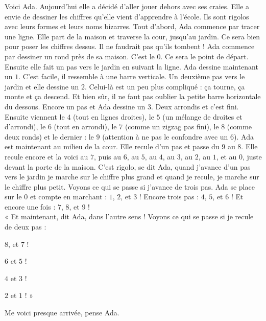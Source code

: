 Voici Ada. Aujourd'hui elle a décidé d'aller jouer dehors avec ses craies. 
Elle a envie de dessiner les chiffres qu'elle vient d'apprendre à l'école. Ils sont rigolos avec leurs formes et leurs noms bizarres.
Tout d'abord, Ada commence par tracer une ligne. Elle part de la maison et traverse la cour, jusqu'au jardin. 
Ce sera bien pour poser les chiffres dessus. Il ne faudrait pas qu'ils tombent ! 
Ada commence par dessiner un rond près de sa maison. C'est le $0$. Ce sera le point de départ. 
Ensuite elle fait un pas vers le jardin en suivant la ligne. Ada dessine maintenant un $1$. C'est facile, il ressemble à une barre verticale. 
Un deuxième pas vers le jardin et elle dessine un $2$. Celui-là est un peu plus compliqué : ça tourne, ça monte et ça descend. Et bien sûr, il ne faut pas oublier la petite barre horizontale du dessous.
Encore un pas et Ada dessine un $3$. Deux arrondis et c'est fini.
Ensuite viennent le $4$ (tout en lignes droites), le $5$ (un mélange de droites et d'arrondi), le $6$ (tout en arrondi), le $7$ (comme un zigzag pas fini), le $8$ (comme deux ronds) et le dernier : le $9$ (attention à ne pas le confondre avec un $6$). 
Ada est maintenant au milieu de la cour. Elle recule d'un pas et passe du $9$ au $8$. Elle recule encore et la voici au $7$, puis au $6$, au $5$, au $4$, au $3$, au $2$, au $1$, et au $0$, juste devant la porte de la maison. 
C'est rigolo, se dit Ada, quand j'avance d'un pas vers le jardin je marche sur le chiffre plus grand et quand je recule, je marche sur le chiffre plus petit. 
Voyons ce qui se passe si j'avance de trois pas. Ada se place sur le $0$ et compte en marchant : $1$, $2$, et $3$ ! Encore trois pas : $4$, $5$, et $6$ ! Et encore une fois : $7$, $8$, et $9$ ! \\
« Et maintenant, dit Ada, dans l'autre sens ! Voyons ce qui se passe si je recule de deux pas : 
\begin{description}
    \item $8$, et $7$ ! 
    \item $6$ et $5$ ! 
    \item $4$ et $3$ ! 
    \item $2$ et $1$ ! »
\end{description} 
Me voici presque arrivée, pense Ada.


%    
